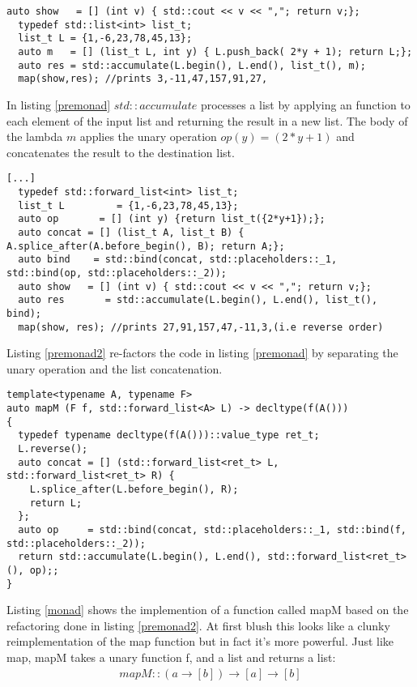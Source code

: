 \documentclass[12pt,fleqn]{article}
\begin{document}
%
\begin{lstlisting}[caption=processing a list using reduce,label=premonad]
 auto show   = [] (int v) { std::cout << v << ","; return v;};
  typedef std::list<int> list_t;
  list_t L = {1,-6,23,78,45,13};
  auto m   = [] (list_t L, int y) { L.push_back( 2*y + 1); return L;};
  auto res = std::accumulate(L.begin(), L.end(), list_t(), m);
  map(show,res); //prints 3,-11,47,157,91,27,
\end{lstlisting}
%
In listing \ref{premonad} $std::accumulate$ processes a list by applying an function to each element of the input list and returning the result in a new list.
The body of the lambda $m$ applies the unary operation $op(y)=(2*y+1)$ and concatenates the result to the destination list. 
%
\begin{lstlisting}[caption=unary operation and reduce,label=premonad2]
  [...]	
  typedef std::forward_list<int> list_t;
  list_t L         = {1,-6,23,78,45,13};
  auto op       = [] (int y) {return list_t({2*y+1});};
  auto concat = [] (list_t A, list_t B) { A.splice_after(A.before_begin(), B); return A;};
  auto bind    = std::bind(concat, std::placeholders::_1, std::bind(op, std::placeholders::_2));
  auto show   = [] (int v) { std::cout << v << ","; return v;};
  auto res       = std::accumulate(L.begin(), L.end(), list_t(), bind);
  map(show, res); //prints 27,91,157,47,-11,3,(i.e reverse order)
\end{lstlisting}
%
Listing \ref{premonad2} re-factors the code in listing \ref{premonad} by separating the unary operation and the list concatenation.
%
\begin{lstlisting}[caption=the list monad, label=listmonad]
  template<typename A, typename F>
auto mapM (F f, std::forward_list<A> L) -> decltype(f(A()))
{
  typedef typename decltype(f(A()))::value_type ret_t;
  L.reverse();
  auto concat = [] (std::forward_list<ret_t> L, std::forward_list<ret_t> R) { 
    L.splice_after(L.before_begin(), R); 
    return L;
  };
  auto op     = std::bind(concat, std::placeholders::_1, std::bind(f, std::placeholders::_2));
  return std::accumulate(L.begin(), L.end(), std::forward_list<ret_t>(), op);;
}
\end{lstlisting}
%
Listing \ref{monad} shows the implemention of a function called mapM based on the refactoring done in listing \ref{premonad2}.
At first blush this looks like a clunky reimplementation of the map function but in fact it's more powerful.
Just like map, mapM takes a unary function f, and a list and returns a list:
\begin{eqnarray*}
mapM :: (a \rightarrow [b]) \rightarrow [a] \rightarrow [b]
\end{eqnarray*}
\end{document}
